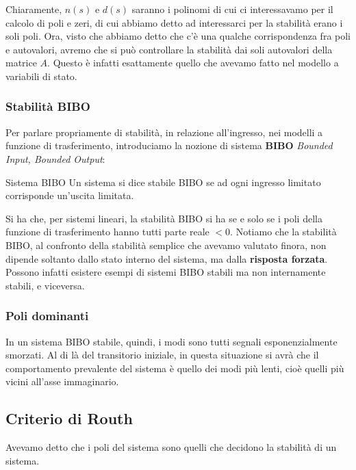 \documentclass[a4paper,11pt]{article}
\begin{document}
Chiaramente, $n(s)$ e $d(s)$ saranno i polinomi di cui ci interessavamo per il calcolo di poli e zeri, di cui abbiamo detto ad interessarci per la stabilità erano i soli poli.
Ora, visto che abbiamo detto che c'è una qualche corrispondenza fra poli e autovalori, avremo che si può controllare la stabilità dai soli autovalori della matrice $A$.
Questo è infatti esattamente quello che avevamo fatto nel modello a variabili di stato.

\subsubsection{Stabilità BIBO}
Per parlare propriamente di stabilità, in relazione all'ingresso, nei modelli a funzione di trasferimento, introduciamo la nozione di sistema \textbf{BIBO} \textit{Bounded Input, Bounded Output}:
\begin{definition}{Sistema BIBO}
	Un sistema si dice stabile BIBO se ad ogni ingresso limitato corrisponde un'uscita limitata.
\end{definition}

Si ha che, per sistemi lineari, la stabilità BIBO si ha se e solo se i poli della funzione di trasferimento hanno tutti parte reale $< 0$.
Notiamo che la stabilità BIBO, al confronto della stabilità semplice che avevamo valutato finora, non dipende soltanto dallo stato interno del sistema, ma dalla \textbf{risposta forzata}.
Possono infatti esistere esempi di sistemi BIBO stabili ma non internamente stabili, e viceversa.

\subsubsection{Poli dominanti}
In un sistema BIBO stabile, quindi, i modi sono tutti segnali esponenzialmente smorzati.
Al di là del transitorio iniziale, in questa situazione si avrà che il comportamento prevalente del sistema è quello dei modi più lenti, cioè quelli più vicini all'asse immaginario.

\subsection{Criterio di Routh}
Avevamo detto che i poli del sistema sono quelli che decidono la stabilità di un sistema.
\end{document}
